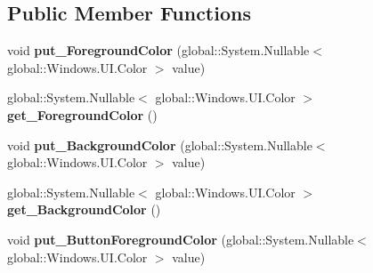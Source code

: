 \subsection*{Public Member Functions}
\begin{DoxyCompactItemize}
\item 
\mbox{\label{class_windows_1_1_u_i_1_1_view_management_1_1_application_view_title_bar_a32a06dddb589fcc84b37bbb52d2fef56}} 
void {\bfseries put\+\_\+\+Foreground\+Color} (global\+::\+System.\+Nullable$<$ global\+::\+Windows.\+U\+I.\+Color $>$ value)
\item 
\mbox{\label{class_windows_1_1_u_i_1_1_view_management_1_1_application_view_title_bar_a0100947ed3af490212e529dba4a068e8}} 
global\+::\+System.\+Nullable$<$ global\+::\+Windows.\+U\+I.\+Color $>$ {\bfseries get\+\_\+\+Foreground\+Color} ()
\item 
\mbox{\label{class_windows_1_1_u_i_1_1_view_management_1_1_application_view_title_bar_a72763c5790a08759eb3aa7f1a034cc1c}} 
void {\bfseries put\+\_\+\+Background\+Color} (global\+::\+System.\+Nullable$<$ global\+::\+Windows.\+U\+I.\+Color $>$ value)
\item 
\mbox{\label{class_windows_1_1_u_i_1_1_view_management_1_1_application_view_title_bar_a10d72a066c2702f38e96eb1f3702b5ab}} 
global\+::\+System.\+Nullable$<$ global\+::\+Windows.\+U\+I.\+Color $>$ {\bfseries get\+\_\+\+Background\+Color} ()
\item 
\mbox{\label{class_windows_1_1_u_i_1_1_view_management_1_1_application_view_title_bar_a607b5d86c746c6283c118cc8e983990a}} 
void {\bfseries put\+\_\+\+Button\+Foreground\+Color} (global\+::\+System.\+Nullable$<$ global\+::\+Windows.\+U\+I.\+Color $>$ value)
\item 
\mbox{\label{class_windows_1_1_u_i_1_1_view_management_1_1_application_view_title_bar_aae493d2a3fa93365f753e29b776af821}} 

\end{DoxyCompactItemize}

